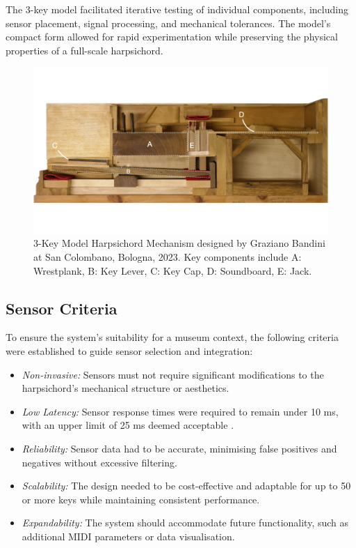 The 3-key model facilitated iterative testing of individual components, including sensor placement, signal processing, and mechanical tolerances. The model’s compact form allowed for rapid experimentation while preserving the physical properties of a full-scale harpsichord.

\begin{figure}
    \centering
    \includegraphics[width=\linewidth]{src/images/3-key-side-labelled.png}
    \caption{3-Key Model Harpsichord Mechanism designed by Graziano Bandini at San Colombano, Bologna, 2023. Key components include A: Wrestplank, B: Key Lever, C: Key Cap, D: Soundboard, E: Jack.}
    \label{fig:3key}
\end{figure}

\subsection{Sensor Criteria}\label{sensor-criteria}

To ensure the system's suitability for a museum context, the following criteria were established to guide sensor selection and integration:

\begin{itemize}
    \item \emph{Non-invasive:} Sensors must not require significant modifications to the harpsichord's mechanical structure or aesthetics.
    \item \emph{Low Latency:} Sensor response times were required to remain under 10 ms, with an upper limit of 25 ms deemed acceptable \cite{Jack2016}.
    \item \emph{Reliability:} Sensor data had to be accurate, minimising false positives and negatives without excessive filtering.
    \item \emph{Scalability:} The design needed to be cost-effective and adaptable for up to 50 or more keys while maintaining consistent performance.
    \item \emph{Expandability:} The system should accommodate future functionality, such as additional MIDI parameters or data visualisation.
\end{itemize}

